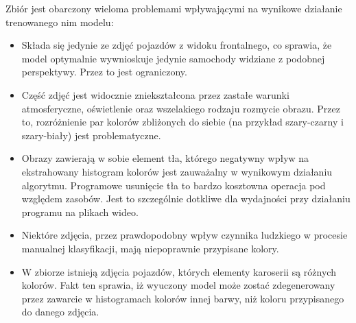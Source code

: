 \pagebreak

Zbiór jest obarczony wieloma problemami wpływającymi na wynikowe działanie trenowanego nim modelu:

\begin{itemize}
    \item Składa się jedynie ze zdjęć pojazdów z widoku frontalnego, co sprawia, że model optymalnie wywnioskuje jedynie samochody widziane z podobnej perspektywy. Przez to jest ograniczony.
    \item Część zdjęć jest widocznie zniekształcona przez zastałe warunki atmosferyczne, oświetlenie oraz wszelakiego rodzaju rozmycie obrazu. Przez to, rozróżnienie par kolorów zbliżonych do siebie (na przykład szary-czarny i szary-biały) jest problematyczne.
    \item Obrazy zawierają w sobie element tła, którego negatywny wpływ na ekstrahowany histogram kolorów jest zauważalny w wynikowym działaniu algorytmu. Programowe usunięcie tła to bardzo kosztowna operacja pod względem zasobów. Jest to szczególnie dotkliwe dla wydajności przy działaniu programu na plikach wideo.
    \item Niektóre zdjęcia, przez prawdopodobny wpływ czynnika ludzkiego w procesie manualnej klasyfikacji, mają niepoprawnie przypisane kolory.
    \item W zbiorze istnieją zdjęcia pojazdów, których elementy karoserii są różnych kolorów. Fakt ten sprawia, iż wyuczony model może zostać zdegenerowany przez zawarcie w histogramach kolorów innej barwy, niż koloru przypisanego do danego zdjęcia.
\end{itemize}




